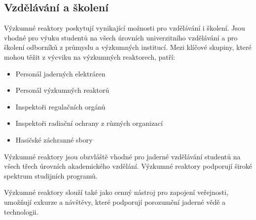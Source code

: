 \subsection{Vzdělávání a školení}

Výzkumné reaktory poskytují vynikající možnosti pro vzdělávání i školení. Jsou vhodné pro výuku studentů na všech úrovních univerzitního vzdělávání a pro školení odborníků z průmyslu a výzkumných institucí. Mezi klíčové skupiny, které mohou těžit z výcviku na výzkumných reaktorech, patří:

\begin{itemize}
    \item Personál jaderných elektráren
    \item Personál výzkumných reaktorů
    \item Inspektoři regulačních orgánů
    \item Inspektoři radiační ochrany z různých organizací
    \item Hasičské záchranné sbory
\end{itemize}

Výzkumné reaktory jsou obzvláště vhodné pro jaderné vzdělávání studentů na všech třech úrovních akademického vzdělání. Výzkumné reaktory podporují široké spektrum studijních programů.

Výzkumné reaktory slouží také jako cenný nástroj pro zapojení veřejnosti, umožňují exkurze a návštěvy, které podporují porozumění jaderné vědě a technologii.